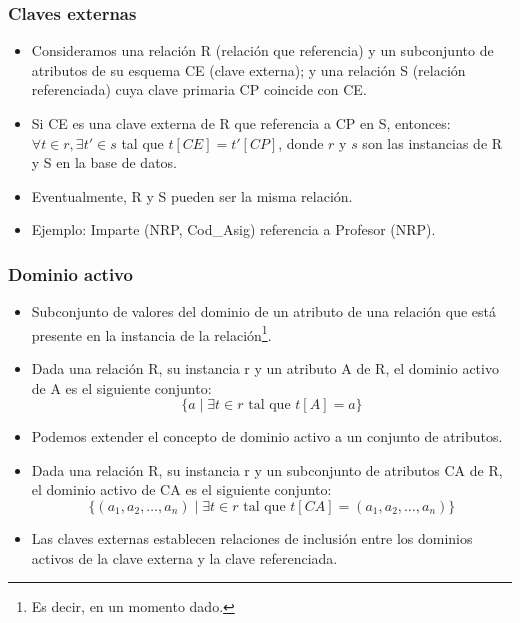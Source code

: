 \subsubsection*{Claves externas}

\begin{itemize}
    \item Consideramos una relación R (relación que referencia) y un subconjunto de atributos de su esquema CE (clave externa); y una relación S (relación referenciada) cuya clave primaria CP coincide con CE.
    \item Si CE es una clave externa de R que referencia a CP en S, entonces: $\forall t \in r, \exists t' \in s$ tal que $t[CE] = t'[CP]$, donde $r$ y $s$ son las instancias de R y S en la base de datos.
    \item Eventualmente, R y S pueden ser la misma relación.
\end{itemize}

\begin{itemize}
    \item Ejemplo: Imparte (NRP, Cod\_Asig) referencia a Profesor (NRP).
\end{itemize}

\subsubsection*{Dominio activo}

\begin{itemize}
    \item Subconjunto de valores del dominio de un atributo de una relación que está presente en la instancia de la relación\footnote{Es decir, en un momento dado.}.
    \item Dada una relación R, su instancia r y un atributo A de R, el dominio activo de A es el siguiente conjunto:
    \[
    \{a \mid \exists t \in r \text{ tal que } t[A] = a\}
    \]
    \item Podemos extender el concepto de dominio activo a un conjunto de atributos.
    \item Dada una relación R, su instancia r y un subconjunto de atributos CA de R, el dominio activo de CA es el siguiente conjunto:
    \[
    \{(a_1, a_2, \ldots, a_n) \mid \exists t \in r \text{ tal que } t[CA] = (a_1, a_2, \ldots, a_n)\}
    \]
    \item Las claves externas establecen relaciones de inclusión entre los dominios activos de la clave externa y la clave referenciada.
\end{itemize}

